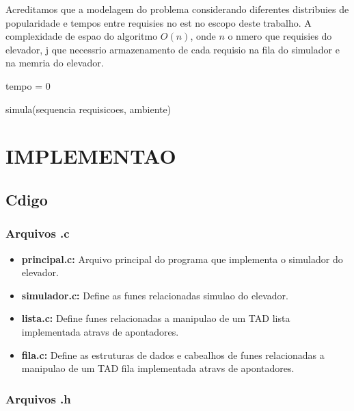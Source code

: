 \documentclass[12pt]{article}
\begin{document}
Acreditamos que a modelagem do problema considerando diferentes distribuies de popularidade e tempos entre requisies no est no escopo deste trabalho. A complexidade de espao do algoritmo  $O(n)$, onde $n$  o nmero que requisies do elevador, j que  necessrio  armazenamento de cada requisio na fila do simulador e na memria do elevador.
\begin{algorithm}[h!]
\begin{footnotesize}

	tempo = 0\;

\caption{simula(sequencia requisicoes, ambiente)}%
\end{footnotesize}
\end{algorithm}

\section{IMPLEMENTAO}
\label{implementacao}


\subsection{Cdigo}

\subsubsection{Arquivos .c}

\begin{itemize}
\item \textbf{principal.c:} Arquivo principal do programa que implementa o simulador do elevador.
\item \textbf{simulador.c:} Define as funes relacionadas  simulao do elevador.
\item \textbf{lista.c:} Define funes relacionadas a manipulao de um TAD lista implementada atravs de apontadores.
\item \textbf{fila.c:}  Define as estruturas de dados e cabealhos de funes relacionadas a manipulao de um TAD fila implementada atravs de apontadores.
\end{itemize}

\subsubsection{Arquivos .h}
\end{document}
